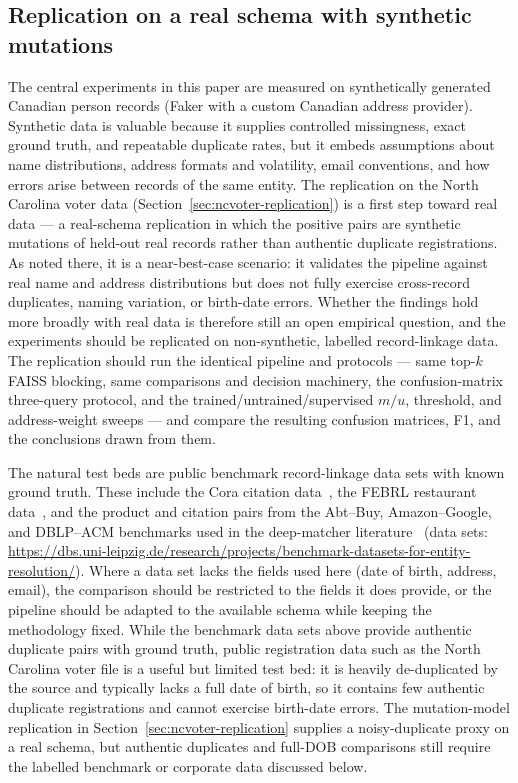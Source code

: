 \documentclass[11pt]{article}
\begin{document}
\subsection{Replication on a real schema with synthetic mutations}
The central experiments in this paper are measured on synthetically generated Canadian person records (Faker with a custom Canadian address provider). Synthetic data is valuable because it supplies controlled missingness, exact ground truth, and repeatable duplicate rates, but it embeds assumptions about name distributions, address formats and volatility, email conventions, and how errors arise between records of the same entity. The replication on the North Carolina voter data (Section~\ref{sec:ncvoter-replication}) is a first step toward real data --- a real-schema replication in which the positive pairs are synthetic mutations of held-out real records rather than authentic duplicate registrations. As noted there, it is a near-best-case scenario: it validates the pipeline against real name and address distributions but does not fully exercise cross-record duplicates, naming variation, or birth-date errors. Whether the findings hold more broadly with real data is therefore still an open empirical question, and the experiments should be replicated on non-synthetic, labelled record-linkage data. The replication should run the identical pipeline and protocols --- same top-$k$ FAISS blocking, same comparisons and decision machinery, the confusion-matrix three-query protocol, and the trained/untrained/supervised $m/u$, threshold, and address-weight sweeps --- and compare the resulting confusion matrices, F1, and the conclusions drawn from them.

The natural test beds are public benchmark record-linkage data sets with known ground truth. These include the Cora citation data~\cite{mccallum2000}, the FEBRL restaurant data~\cite{christen2012}, and the product and citation pairs from the Abt--Buy, Amazon--Google, and DBLP--ACM benchmarks used in the deep-matcher literature~\cite{mudgal2018} (data sets: \url{https://dbs.uni-leipzig.de/research/projects/benchmark-datasets-for-entity-resolution/}). Where a data set lacks the fields used here (date of birth, address, email), the comparison should be restricted to the fields it does provide, or the pipeline should be adapted to the available schema while keeping the methodology fixed. While the benchmark data sets above provide authentic duplicate pairs with ground truth, public registration data such as the North Carolina voter file is a useful but limited test bed: it is heavily de-duplicated by the source and typically lacks a full date of birth, so it contains few authentic duplicate registrations and cannot exercise birth-date errors. The mutation-model replication in Section~\ref{sec:ncvoter-replication} supplies a noisy-duplicate proxy on a real schema, but authentic duplicates and full-DOB comparisons still require the labelled benchmark or corporate data discussed below.
\end{document}
